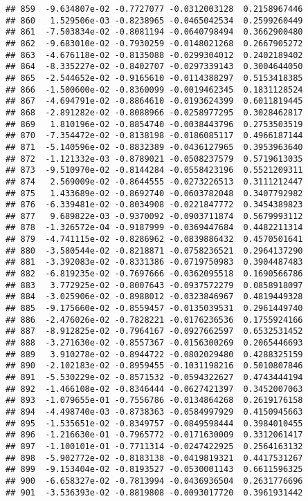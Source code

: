 \documentclass[
]{article}
\begin{document}
\begin{verbatim}
## 859  -9.634807e-02 -0.7727077 -0.0312003128  0.2158967446
## 860   1.529506e-03 -0.8238965 -0.0465042534  0.2599260449
## 861  -7.503834e-02 -0.8081194 -0.0640798494  0.3662900480
## 862  -9.683010e-02 -0.7930259 -0.0148021268  0.2667905272
## 863  -4.676118e-02 -0.8135088 -0.0299304012  0.2402189402
## 864  -8.335227e-02 -0.8402707 -0.0297339143  0.3004644050
## 865  -2.544652e-02 -0.9165610 -0.0114388297  0.5153418385
## 866  -1.500600e-02 -0.8360099 -0.0019462345  0.1831128524
## 867  -4.694791e-02 -0.8864610 -0.0193624399  0.6011819445
## 868  -2.891282e-02 -0.8088966 -0.0258977295  0.3028462817
## 869   1.810196e-02 -0.8854740 -0.0038443796  0.2753503519
## 870  -7.354472e-02 -0.8138198 -0.0186085117  0.4966187144
## 871  -5.140596e-02 -0.8832389 -0.0436127965  0.3953963640
## 872  -1.121332e-03 -0.8789021 -0.0508237579  0.5719613035
## 873  -9.510970e-02 -0.8144284 -0.0558423196  0.5521209311
## 874   2.569009e-02 -0.8644555 -0.0273226513  0.3111212447
## 875   1.433689e-02 -0.8692740 -0.0603782048  0.3407792982
## 876  -6.339481e-02 -0.8034908 -0.0221847772  0.3454389823
## 877   9.689822e-03 -0.9370092 -0.0903711874  0.5679993112
## 878  -1.326572e-04 -0.9187999 -0.0369447684  0.4482211314
## 879  -4.741115e-02 -0.8286962 -0.0839886432  0.4570501641
## 880  -3.580544e-02 -0.8218871 -0.0758236521  0.2964137290
## 881  -3.392083e-02 -0.8331386 -0.0719750983  0.3904487483
## 882  -6.819235e-02 -0.7697666 -0.0362095518  0.1690566786
## 883   3.772925e-02 -0.8007643 -0.0937572279  0.0858918097
## 884  -3.025906e-02 -0.8988012 -0.0323846967  0.4819449328
## 885  -9.175660e-02 -0.8559457 -0.0135039531  0.2961449740
## 886  -2.476026e-02 -0.7828221 -0.0176236536  0.1755924166
## 887  -8.912825e-02 -0.7964167 -0.0927662597  0.6532531452
## 888  -3.271630e-02 -0.8557367 -0.0156300269  0.2065446693
## 889   3.910278e-02 -0.8944722 -0.0802029480  0.4288325159
## 890  -2.102183e-02 -0.8959455 -0.1031198216  0.5010807846
## 891  -5.530229e-02 -0.8571532 -0.0594322627  0.4743444194
## 892  -1.466108e-02 -0.8346444 -0.0627421397  0.3452007063
## 893  -1.079655e-01 -0.7556786 -0.0134864268  0.2619176158
## 894  -4.498740e-03 -0.8738363 -0.0584997929  0.4150945663
## 895  -1.535651e-02 -0.8349757 -0.0849598444  0.3984010455
## 896  -1.216630e-01 -0.7965772 -0.0171630009  0.3312061417
## 897  -1.100101e-01 -0.7711314 -0.0247422925  0.2564163132
## 898  -5.902772e-02 -0.8183138 -0.0419819321  0.4417531267
## 899  -9.153404e-02 -0.8193527 -0.0530001143  0.6611596325
## 900  -6.658327e-02 -0.7813994 -0.0436936504  0.2631776696
## 901  -3.536393e-02 -0.8819808 -0.0093017720  0.3961931442

\end{verbatim}
\end{document}
